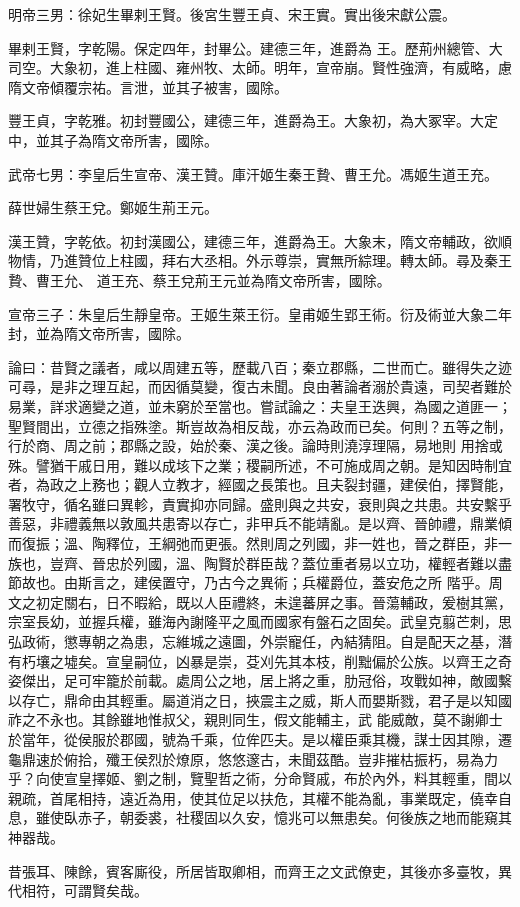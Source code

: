 \begin{pinyinscope}
 明帝三男：徐妃生畢剌王賢。後宮生豐王貞、宋王實。實出後宋獻公震。



 畢剌王賢，字乾陽。保定四年，封畢公。建德三年，進爵為
 王。歷荊州總管、大司空。大象初，進上柱國、雍州牧、太師。明年，宣帝崩。賢性強濟，有威略，慮隋文帝傾覆宗祐。言泄，並其子被害，國除。



 豐王貞，字乾雅。初封豐國公，建德三年，進爵為王。大象初，為大冢宰。大定中，並其子為隋文帝所害，國除。



 武帝七男：李皇后生宣帝、漢王贊。庫汗姬生秦王贄、曹王允。馮姬生道王充。



 薛世婦生蔡王兌。鄭姬生荊王元。



 漢王贊，字乾依。初封漢國公，建德三年，進爵為王。大象末，隋文帝輔政，欲順物情，乃進贊位上柱國，拜右大丞相。外示尊崇，實無所綜理。轉太師。尋及秦王贄、曹王允、
 道王充、蔡王兌荊王元並為隋文帝所害，國除。



 宣帝三子：朱皇后生靜皇帝。王姬生萊王衍。皇甫姬生郢王術。衍及術並大象二年封，並為隋文帝所害，國除。



 論曰：昔賢之議者，咸以周建五等，歷載八百；秦立郡縣，二世而亡。雖得失之迹可尋，是非之理互起，而因循莫變，復古未聞。良由著論者溺於貴遠，司契者難於易業，詳求適變之道，並未窮於至當也。嘗試論之：夫皇王迭興，為國之道匪一；聖賢間出，立德之指殊塗。斯豈故為相反哉，亦云為政而已矣。何則？五等之制，行於商、周之前；郡縣之設，始於秦、漢之後。論時則澆淳理隔，易地則
 用捨或殊。譬猶干戚日用，難以成垓下之業；稷嗣所述，不可施成周之朝。是知因時制宜者，為政之上務也；觀人立教才，經國之長策也。且夫裂封疆，建侯伯，擇賢能，署牧守，循名雖曰異軫，責實抑亦同歸。盛則與之共安，衰則與之共患。共安繫乎善惡，非禮義無以敦風共患寄以存亡，非甲兵不能靖亂。是以齊、晉帥禮，鼎業傾而復振；溫、陶釋位，王綱弛而更張。然則周之列國，非一姓也，晉之群臣，非一族也，豈齊、晉忠於列國，溫、陶賢於群臣哉？蓋位重者易以立功，權輕者難以盡節故也。由斯言之，建侯置守，乃古今之異術；兵權爵位，蓋安危之所
 階乎。周文之初定關右，日不暇給，既以人臣禮終，未遑蕃屏之事。晉蕩輔政，爰樹其黨，宗室長幼，並握兵權，雖海內謝隆平之風而國家有盤石之固矣。武皇克翦芒刺，思弘政術，懲專朝之為患，忘維城之遠圖，外崇寵任，內結猜阻。自是配天之基，潛有朽壤之墟矣。宣皇嗣位，凶暴是崇，芟刈先其本枝，削黜偏於公族。以齊王之奇姿傑出，足可牢籠於前載。處周公之地，居上將之重，肋冠俗，攻戰如神，敵國繫以存亡，鼎命由其輕重。屬道消之日，挾震主之威，斯人而嬰斯戮，君子是以知國祚之不永也。其餘雖地惟叔父，親則同生，假文能輔主，武
 能威敵，莫不謝卿士於當年，從侯服於郡國，號為千乘，位侔匹夫。是以權臣乘其機，謀士因其隙，遷龜鼎速於俯拾，殲王侯烈於燎原，悠悠邃古，未聞茲酷。豈非摧枯振朽，易為力乎？向使宣皇擇姬、劉之制，覽聖哲之術，分命賢戚，布於內外，料其輕重，間以親疏，首尾相持，遠近為用，使其位足以扶危，其權不能為亂，事業既定，僥幸自息，雖使臥赤子，朝委裘，社稷固以久安，憶兆可以無患矣。何後族之地而能窺其神器哉。



 昔張耳、陳餘，賓客廝役，所居皆取卿相，而齊王之文武僚吏，其後亦多臺牧，異代相符，可謂賢矣哉。



\end{pinyinscope}